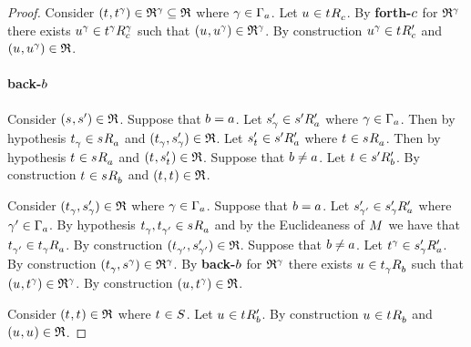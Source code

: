\begin{proof}
Consider $(\kStateT, \kStateT[\gamma]) \in \refinement^\gamma \subseteq \refinement$ where $\gamma \in \Gamma_\agentA$.
Let $\kStateU \in \kSuccessorsC{\kStateT}$.
By {\bf forth-$\agentC$} for $\refinement^\gamma$ there exists $\kStateU[\gamma] \in \kSuccessorsC[\gamma]{\kStateT[\gamma]}$ such that $(\kStateU, \kStateU[\gamma]) \in \refinement^\gamma$.
By construction $\kStateU[\gamma] \in \kSuccessorsPC{\kStateT}$ and $(\kStateU, \kStateU[\gamma]) \in \refinement$.

\paragraph{back-$\agentB$}
Consider $(\kStateS, \kStateSP) \in \refinement$.
Suppose that $\agentB = \agentA$.
Let $\kStateSP_\gamma \in \kSuccessorsPA{\kStateSP}$ where $\gamma \in \Gamma_\agentA$.
Then by hypothesis $\kStateT_\gamma \in \kSuccessorsA{\kStateS}$ and $(\kStateT_\gamma, \kStateSP_\gamma) \in \refinement$.
Let $\kStateSP_{\kStateT} \in \kSuccessorsPA{\kStateSP}$ where $\kStateT \in \kSuccessorsA{\kStateS}$.
Then by hypothesis $\kStateT \in \kSuccessorsA{\kStateS}$ and $(\kStateT, \kStateSP_{\kStateT}) \in \refinement$.
Suppose that $\agentB \neq \agentA$.
Let $\kStateT \in \kSuccessorsPB{\kStateSP}$.
By construction $\kStateT \in \kSuccessorsB{\kStateS}$ and $(\kStateT, \kStateT) \in \refinement$.

Consider $(\kStateT_\gamma, \kStateSP_\gamma) \in \refinement$ where $\gamma \in \Gamma_\agentA$.
Suppose that $\agentB = \agentA$.
Let $\kStateSP_{\gamma'} \in \kSuccessorsPA{\kStateSP_\gamma}$ where $\gamma' \in \Gamma_\agentA$.
By hypothesis $\kStateT_{\gamma}, \kStateT_{\gamma'} \in \kSuccessorsA{\kStateS}$ and by the Euclideaness of $\kModel$ we have that $\kStateT_{\gamma'} \in \kSuccessorsA{\kStateT_\gamma}$.
By construction $(\kStateT_{\gamma'}, \kStateSP_{\gamma'}) \in \refinement$.
Suppose that $\agentB \neq \agentA$.
Let $\kStateT[\gamma] \in \kSuccessorsPA{\kStateSP_\gamma}$.
By construction $(\kStateT_\gamma, \kStateS[\gamma]) \in \refinement^\gamma$.
By {\bf back-$\agentB$} for $\refinement^\gamma$ there exists $\kStateU \in \kSuccessorsB{\kStateT_\gamma}$ such that $(\kStateU, \kStateT[\gamma]) \in \refinement^\gamma$.
By construction $(\kStateU, \kStateT[\gamma]) \in \refinement$.

Consider $(\kStateT, \kStateT) \in \refinement$ where $\kStateT \in \kStates$.
Let $\kStateU \in \kSuccessorsPB{\kStateT}$.
By construction $\kStateU \in \kSuccessorsB{\kStateT}$ and $(\kStateU, \kStateU) \in \refinement$.


\end{proof}
